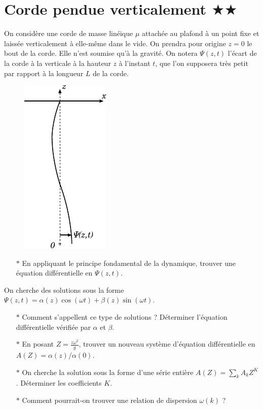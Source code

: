 \documentclass{report}
\begin{document}
\newpage

\section*{Corde pendue verticalement  $\bigstar\bigstar$}

On considère une corde de masse linéique $\mu$ attachée au plafond à un point fixe et laissée verticalement à elle-même dans le vide. On prendra pour origine $z=0$ le bout de la corde. Elle n'est soumise qu'à la gravité. On notera $\Psi(z,t)$ l'écart de la corde à la verticale à la hauteur $z$ à l'instant $t$, que l'on supposera très petit par rapport à la longueur $L$ de la corde.

\begin{figure}[h!]
\centering
	\includegraphics[scale=1.5]{onde4.pdf}
\end{figure}


\begin{itemize}

	\item[$\ast$] En appliquant le principe fondamental de la dynamique, trouver une équation différentielle en  $\Psi(z,t)$.

\end{itemize}

On cherche des solutions sous la forme $\Psi(z,t)=\alpha(z)\cos(\omega t)+\beta(z)\sin(\omega t)$. 

\begin{itemize}
	
		\item[$\ast$] Comment s'appellent ce type de solutions ? Déterminer l'équation différentielle vérifiée par $\alpha$ et $\beta$.
		
		\item[$\ast$] En posant $Z=\frac{z\omega^2}{g}$, trouver un nouveau système d'équation différentielle en $A(Z)=\alpha(z)/\alpha(0)$. 
		
		\item[$\ast$] On cherche la solution sous la forme d'une série entière $A(Z)=\sum_k A_k Z^K$. Déterminer les coefficients $K$. 
		
		\item[$\ast$] Comment pourrait-on trouver une relation de dispersion $\omega(k)$ ?
		
\end{itemize}
\end{document}
